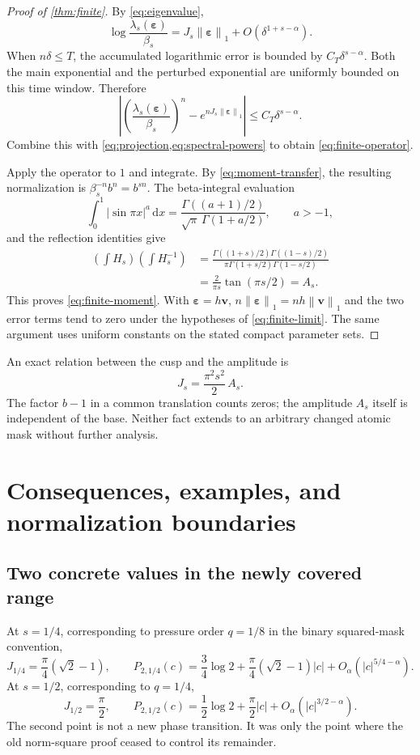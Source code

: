 \documentclass[11pt,a4paper]{article}
\numberwithin{equation}{section}
\theoremstyle{definition}
\theoremstyle{remark}
\newcommand{\dd}{\,\mathrm d}
\newcommand{\norm}[1]{\left\lVert#1\right\rVert}
\newcommand{\eps}{\boldsymbol\varepsilon}
\newcommand{\vel}{\boldsymbol v}
\begin{document}
\begin{proof}[Proof of \cref{thm:finite}]
By \cref{eq:eigenvalue},
\[
 \log\frac{\lambda_s(\eps)}{\beta_s}
 =J_s\norm\eps_1+O(\delta^{1+s-\alpha}).
\]
When $n\delta\leq T$, the accumulated logarithmic error is bounded
by $C_T\delta^{s-\alpha}$. Both the main exponential and the perturbed
exponential are uniformly bounded on this time window. Therefore
\[
 \left|\left(\frac{\lambda_s(\eps)}{\beta_s}\right)^n
             -e^{nJ_s\norm\eps_1}\right|
 \leq C_T\delta^{s-\alpha}.
\]
Combine this with \cref{eq:projection,eq:spectral-powers} to obtain
\cref{eq:finite-operator}.

Apply the operator to $1$ and integrate. By
\cref{eq:moment-transfer}, the resulting normalization is
$\beta_s^{-n}b^n=b^{sn}$. The beta-integral evaluation
\[
 \int_0^1|\sin\pi x|^a\dd x
 =\frac{\Gamma((a+1)/2)}{\sqrt\pi\,\Gamma(1+a/2)},\qquad a>-1,
\]
and the reflection identities \cite{DLMF} give
\begin{align}
 \left(\int H_s\right)\left(\int H_s^{-1}\right)
 &=\frac{\Gamma((1+s)/2)\Gamma((1-s)/2)}
          {\pi\Gamma(1+s/2)\Gamma(1-s/2)}\\
 &=\frac{2}{\pi s}\tan(\pi s/2)=A_s.
 \label{eq:amplitude}
\end{align}
This proves \cref{eq:finite-moment}. With $\eps=h\vel$,
$n\norm\eps_1=nh\norm\vel_1$ and the two error terms tend to zero
under the hypotheses of \cref{eq:finite-limit}.
The same argument uses uniform constants on the stated compact
parameter sets.
\end{proof}

An exact relation between the cusp and the amplitude is
\begin{equation}
 J_s=\frac{\pi^2s^2}{2}\,A_s.
 \label{eq:amplitude-cusp}
\end{equation}
The factor $b-1$ in a common translation counts zeros; the amplitude
$A_s$ itself is independent of the base. Neither fact extends to an
arbitrary changed atomic mask without further analysis.

\section{Consequences, examples, and normalization boundaries}
\label{sec:examples}

\subsection{Two concrete values in the newly covered range}
At $s=1/4$, corresponding to pressure order $q=1/8$ in the binary
squared-mask convention,
\[
 J_{1/4}=\frac\pi4(\sqrt2-1),\qquad
 P_{2,1/4}(c)=\frac34\log2+\frac\pi4(\sqrt2-1)|c|
           +O_\alpha(|c|^{5/4-\alpha}).
\]
At $s=1/2$, corresponding to $q=1/4$,
\[
 J_{1/2}=\frac\pi2,\qquad
 P_{2,1/2}(c)=\frac12\log2+\frac\pi2|c|
           +O_\alpha(|c|^{3/2-\alpha}).
\]
The second point is not a new phase transition. It was only the point
where the old norm-square proof ceased to control its remainder.
\end{document}
